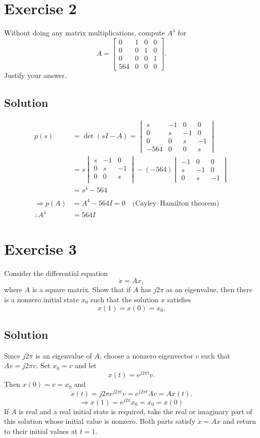 \documentclass[12pt,a4paper]{article}
\begin{document}
\section*{Exercise 2}
Without doing any matrix multiplications, compute $A^4$ for
\[
A=\begin{bmatrix}
0&1&0&0\\
0&0&1&0\\
0&0&0&1\\
564&0&0&0
\end{bmatrix}.
\]
Justify your answer.
\subsection*{Solution}
\begin{align*}
p(s)&=\det(sI-A)=
\begin{vmatrix}
s&-1&0&0\\
0&s&-1&0\\
0&0&s&-1\\
-564&0&0&s
\end{vmatrix} \\
&= s \begin{vmatrix}
	s & -1 & 0 \\
	0 & s & -1 \\
	0 & 0 & s \\
\end{vmatrix} - (-564)\begin{vmatrix}
-1 &  0 & 0 \\
s & -1 & 0 \\
0 & s & -1
\end{vmatrix} \\
&= s^4 - 564 \\ \\
\Rightarrow p(A) &= A^4 - 564I = 0 \quad \text{(Cayley--Hamilton theorem)} \\
\therefore A^4 &= 564I
\end{align*}


\section*{Exercise 3}
Consider the differential equation
\[
\dot{x}=Ax,
\]
where $A$ is a square matrix. Show that if $A$ has $j2\pi$ as an eigenvalue, then there is a nonzero initial state $x_0$ such that the solution $x$ satisfies
\[
x(1)=x(0)=x_0.
\]
\subsection*{Solution}
Since $j2\pi$ is an eigenvalue of $A$, choose a nonzero eigenvector
$v$ such that $Av=j2\pi v$. Set $x_0=v$ and let
\[
x(t)=e^{j2\pi t}v.
\]
Then $x(0)=v=x_0$ and
\[
\dot{x}(t)=j2\pi e^{j2\pi t}v
=e^{j2\pi t}Av=Ax(t).
\]
\[
\Rightarrow x(1) = e^{j2\pi}x_0 = x_0 = x(0)
\]
If $A$ is real and a real initial state is required, take the real
or imaginary part of this solution whose initial value is nonzero.
Both parts satisfy $\dot{x}=Ax$ and return to their initial values at $t=1$.
\end{document}
